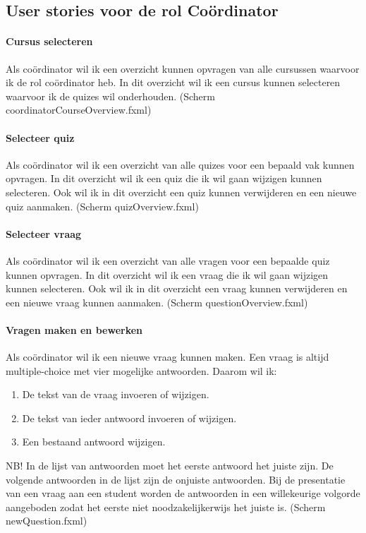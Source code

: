 \documentclass[11pt, a4paper]{article}
\begin{document}
\subsection{User stories voor de rol Co\"ordinator}

\paragraph{Cursus selecteren} Als co\"ordinator wil ik een overzicht kunnen opvragen van alle cursussen waarvoor ik de rol co\"ordinator heb.
In dit overzicht wil ik een cursus kunnen selecteren waarvoor ik de quizes wil onderhouden. (Scherm coordinatorCourseOverview.fxml)

\paragraph{Selecteer quiz} Als co\"ordinator wil ik een overzicht van alle quizes voor een bepaald vak kunnen opvragen.
In dit overzicht wil ik een quiz die ik wil gaan wijzigen kunnen selecteren.
Ook wil ik in dit overzicht een quiz kunnen verwijderen en een nieuwe quiz aanmaken. (Scherm quizOverview.fxml)

\paragraph{Selecteer vraag} Als co\"ordinator wil ik een overzicht van alle vragen voor een bepaalde quiz kunnen opvragen.
In dit overzicht wil ik een vraag die ik wil gaan wijzigen kunnen selecteren.
Ook wil ik in dit overzicht een vraag kunnen verwijderen en een nieuwe vraag kunnen aanmaken. (Scherm questionOverview.fxml)

\paragraph{Vragen maken en bewerken} Als co\"ordinator wil ik een nieuwe vraag kunnen maken.
Een vraag is altijd multiple-choice met vier mogelijke antwoorden.
Daarom wil ik:
\begin{enumerate}
\item De tekst van de vraag invoeren of wijzigen.
\item De tekst van ieder antwoord invoeren of wijzigen.
\item Een bestaand antwoord wijzigen.
\end{enumerate}

NB! In de lijst van antwoorden moet het eerste antwoord het juiste zijn.
De volgende antwoorden in de lijst zijn de onjuiste antwoorden.
Bij de presentatie van een vraag aan een student worden de antwoorden in een willekeurige volgorde aangeboden zodat het eerste niet noodzakelijkerwijs het juiste is. (Scherm newQuestion.fxml)
\end{document}
